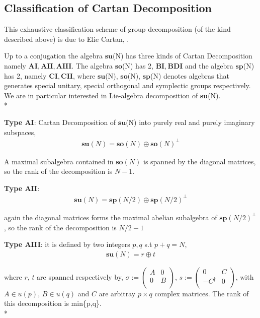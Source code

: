 \subsection*{Classification of Cartan Decomposition}

This exhaustive classification scheme of group decomposition (of the kind described above) is due to Elie Cartan, \cite{Cartan}.

Up to a conjugation the algebra $\mathbf{su}$(N) has three kinds of Cartan Decomposition namely $\mathbf{AI},\mathbf{AII},\mathbf{AIII}$. The algebra $\mathbf{so}$(N) has 2,  $\mathbf{BI},\mathbf{BDI}$ and the algebra $\mathbf{sp}$(N) has 2, namely  $\mathbf{CI},\mathbf{CII}$, where $\mathbf{su}$(N), $\mathbf{so}$(N), $\mathbf{sp}$(N) denotes algebras that generates special unitary, special orthogonal and symplectic groups respectively. We are in particular interested in Lie-algebra decomposition of $\mathbf{su}$(N).\\*


\textbf{Type AI}: Cartan Decomposition of $\mathbf{su}$(N) into purely real and purely imaginary subspaces,
\begin{align}
    \mathbf{su}(N) =\mathbf{so}(N) \oplus \mathbf{so}(N)^{\perp}
\end{align}

A maximal subalgebra contained in $\mathbf{so}(N)$ is spanned by the diagonal matrices, so the rank of the decomposition is $N-1$.

\textbf{Type AII}: 
\begin{align}
    \mathbf{su}(N) =\mathbf{sp}(N/2) \oplus \mathbf{sp}(N/2)^{\perp}
\end{align}

again the diagonal matrices forms the maximal abelian subalgebra of $\mathbf{sp}(N/2)^{\perp}$, so the rank of the decomposition is $N/2-1$

\textbf{Type AIII}: it is defined by two integers $p,q$ s.t $p+q=N$,
\begin{align}
    \mathbf{su}(N) = r \oplus t 
\end{align}

where $r$, $t$ are spanned respectively by, 
$\sigma:=\begin{pmatrix}
 A & 0  \\
 0 & B  \\
\end{pmatrix}$, 
$s:=\begin{pmatrix}
 0 & C  \\
 -C^{\dagger} & 0  \\
\end{pmatrix}$, with $A \in u(p)$, $B \in u(q)$  and $C$ are arbitray $p\times q$ complex matrices. The rank of this decomposition is min\{p,q\}.\\*




